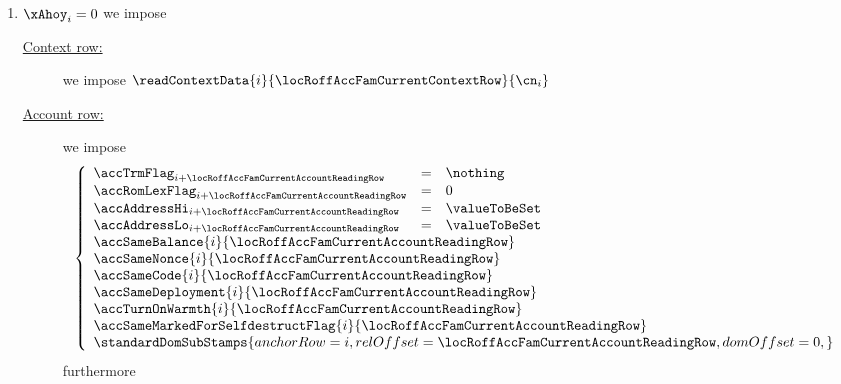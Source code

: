 \begin{description}
\begin{enumerate}
				\begin{enumerate}
					\item \If $\xAhoy_{i} = 0$ \Then we impose
						\begin{description}
							\item[\underline{Context row:}]
								we impose
								$\readContextData {i}{\locRoffAccFamCurrentContextRow}{\cn_{i}}$
							\item[\underline{Account row:}]
								we impose
								\[
									\left\{ \begin{array}{lcl}
										\accTrmFlag      _{i + \locRoffAccFamCurrentAccountReadingRow} & = & \nothing      \\
										\accRomLexFlag   _{i + \locRoffAccFamCurrentAccountReadingRow} & = & 0             \\
										\accAddressHi    _{i + \locRoffAccFamCurrentAccountReadingRow} & = & \valueToBeSet \\
										\accAddressLo    _{i + \locRoffAccFamCurrentAccountReadingRow} & = & \valueToBeSet \\
										\multicolumn{3}{l}{\accSameBalance                     {i}{\locRoffAccFamCurrentAccountReadingRow}} \\
										\multicolumn{3}{l}{\accSameNonce                       {i}{\locRoffAccFamCurrentAccountReadingRow}} \\
										\multicolumn{3}{l}{\accSameCode                        {i}{\locRoffAccFamCurrentAccountReadingRow}} \\
										\multicolumn{3}{l}{\accSameDeployment                  {i}{\locRoffAccFamCurrentAccountReadingRow}} \\
										\multicolumn{3}{l}{\accTurnOnWarmth                    {i}{\locRoffAccFamCurrentAccountReadingRow}} \\
										\multicolumn{3}{l}{\accSameMarkedForSelfdestructFlag   {i}{\locRoffAccFamCurrentAccountReadingRow}} \\
										\multicolumn{3}{l}{
											\standardDomSubStamps {
												anchorRow        = i                                      ,
												relOffset        = \locRoffAccFamCurrentAccountReadingRow ,
												domOffset        = 0                                      ,
											}
										} \\
									\end{array} \right.
								\]
								furthermore
								\begin{enumerate}

\end{enumerate}
\end{description}
\end{enumerate}
\end{enumerate}
\end{description}
